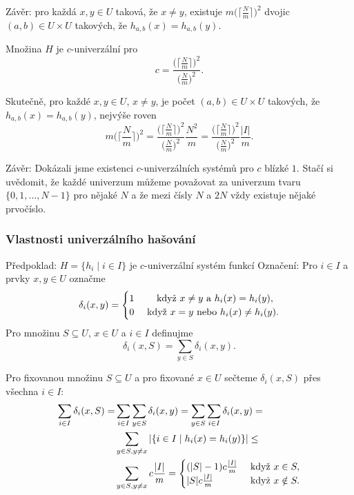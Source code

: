 \documentclass[a4paper,12pt]{article}
\begin{document}
Závěr: pro každá $x,y\in U$ taková, že 
$x\ne y$, existuje $m\big(\lceil\frac Nm\rceil\big)^2$ dvojic $(a
,b)\in U\times U$ takových, že 
$h_{a,b}(x)=h_{a,b}(y)$.

\begin{veta}Množina $H$ je $c$-univerzální pro 
$$c=\frac {\big(\lceil\frac Nm\rceil\big)^2}{\big(\frac Nm\big)^2}
.$$
\end{veta}

Skutečně, pro každé $x,y\in U$, $x\ne y$, je počet 
$(a,b)\in U\times U$ takových, že $h_{a,b}(x)=h_{a,b}(y)$, nejvýše roven
$$m\big(\lceil\frac Nm\rceil\big)^2=\frac {\big(\lceil\frac Nm\rceil\big
)^2}{\big(\frac Nm\big)^2}\frac {N^2}m=\frac {\big(\lceil\frac Nm
\rceil\big)^2}{\big(\frac Nm\big)^2}\frac {|I|}m.$$

Závěr: Dokázali jsme existenci $c$-univerzálních 
systémů pro $c$ blízké $1$. Stačí si uvědomit, že  každé univerzum můžeme 
považovat za univerzum tvaru $\{0,1,\dots,N-1\}$ pro nějaké 
$N$ a že mezi čísly $N$ a $2N$ vždy existuje nějaké 
prvočíslo.

\subsubsection{Vlastnosti univerzálního hašování}

Předpoklad: $H=\{h_i\mid i\in I\}$ je $c$-univerzální systém funkcí\newline 
Označení: Pro $i\in I$ a prvky $x,y\in U$ 
označme 
$$\delta_i(x,y)=\begin{cases} 1&\quad\text{\rm\ když }x\ne y\text{\rm\ a }
h_i(x)=h_i(y),\\
0&\text{\rm\ když }x=y\text{\rm\ nebo }h_i(x)\ne h_i(y).\end{cases} $$
Pro množinu $S\subseteq U$, $x\in U$ a $i\in I$ definujme
$$\delta_i(x,S)=\sum_{y\in S}\delta_i(x,y).$$

Pro fixovanou množinu $S\subseteq U$ a pro fixované $
x\in U$ sečteme
$\delta_i(x,S)$ přes všechna $i\in I$:
\begin{align*}\sum_{i\in I}\delta_i(x,S)=&\sum_{i\in I}\sum_{y\in S}\delta_
i(x,y)=\sum_{y\in S}\sum_{i\in I}\delta_i(x,y)=\\
&\sum_{y\in S,y\ne x}|\{i\in I\mid h_i(x)=h_i(y)\}|\le\\
&\sum_{y\in S,y\ne x}c\frac {|I|}m=\begin{cases} (|S|-1)c\frac {|I|}m&\text{\rm\ když }
x\in S,\\
|S|c\frac {|I|}m&\text{\rm\ když }x\notin S.\end{cases} \end{align*}
\end{document}
